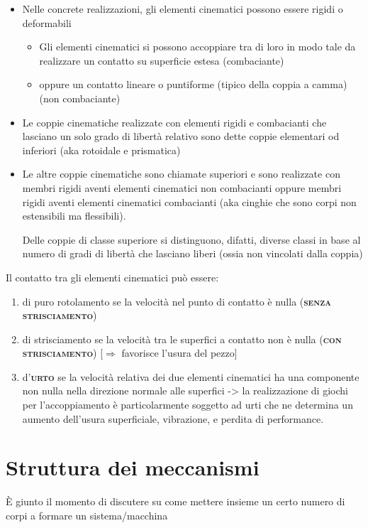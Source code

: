 \begin{itemize}
 
\item Nelle concrete realizzazioni, gli elementi cinematici possono essere rigidi o deformabili
\begin{itemize} \item Gli elementi cinematici si possono accoppiare tra di loro in modo tale da realizzare un contatto su superficie estesa (combaciante)
		\item oppure un contatto lineare o puntiforme (tipico della coppia a camma) (non combaciante)
\end{itemize}
\item Le coppie cinematiche realizzate con elementi rigidi e combacianti che lasciano un solo grado di libertà relativo sono dette coppie elementari od inferiori
		(aka rotoidale e prismatica)
\item Le altre coppie cinematiche sono chiamate superiori e sono realizzate con membri rigidi aventi elementi cinematici non combacianti oppure membri rigidi aventi elementi cinematici combacianti 
		(aka cinghie che sono corpi non estensibili ma flessibili).
		
		Delle coppie di classe superiore si distinguono, difatti, diverse classi in base al numero di gradi di libertà che lasciano liberi (ossia non vincolati dalla coppia)
 \end{itemize}

 Il contatto tra gli elementi cinematici può essere:
 \begin{enumerate}
\item di puro rotolamento se la velocità nel punto di contatto è nulla ({\scshape{\bfseries senza strisciamento}})
\item di strisciamento se la velocità tra le superfici a contatto non è nulla ({\scshape{\bfseries con strisciamento}}) [$\Rightarrow$ favorisce l'usura del pezzo]
\item d'{\scshape{\bfseries urto}} se la velocità relativa dei due elementi cinematici ha una componente non nulla nella direzione normale alle superfici
	-> la realizzazione di giochi per l'accoppiamento è  particolarmente soggetto ad urti che ne determina un aumento dell'usura superficiale, vibrazione, e perdita di performance.
 \end{enumerate}

\section{Struttura dei meccanismi}

È giunto il momento di discutere su come mettere insieme un certo numero di corpi a formare un sistema/macchina\newline

